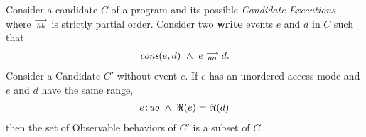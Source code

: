 

\begin{theorem}
    \label{WriteElim}
    Consider a candidate $C$ of a program and its possible \textit{Candidate Executions} where $\stackrel{\longrightarrow}{_\textit{hb}}$ is strictly partial order. Consider two \textbf{write} events $e$ and $d$ in $C$ such that 
    \begin{align*}
        \textit{cons}(e,d) \ \wedge \ e\stackrel{\longrightarrow}{_{ao}}d. 
    \end{align*}
    Consider a Candidate $C'$ without event $e$.  
    If $e$ has an unordered access mode and $e$ and $d$ have the same range, 
    \begin{align*}
        e\!:\!\textit{uo} \ \wedge \ \Re(e) = \Re(d) 
    \end{align*}
    then the set of Observable behaviors of $C'$ is a subset of $C$.  
\end{theorem}